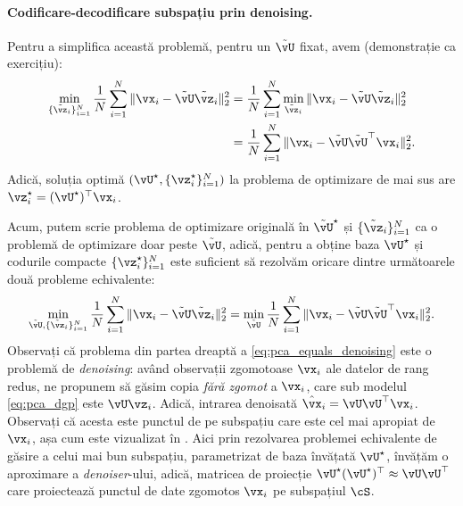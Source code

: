 \documentclass[../../book-main_ro.tex]{subfiles}
\begin{document}
\paragraph{Codificare-decodificare subspațiu prin denoising.}
Pentru a simplifica această problemă, pentru un \(\tilde{\vU}\) fixat, avem (demonstrație ca exercițiu):
\begin{align}
    \min_{\{\tilde{\vz}_{i}\}_{i = 1}^{N}}\frac{1}{N}\sum_{i = 1}^{N}\norm{\vx_{i} - \tilde{\vU}\tilde{\vz}_{i}}_{2}^{2} 
    &= \frac{1}{N}\sum_{i = 1}^{N}\min_{\tilde{\vz}_{i}}\norm{\vx_{i} - \tilde{\vU}\tilde{\vz}_{i}}_{2}^{2} \\
    &= \frac{1}{N}\sum_{i = 1}^{N}\norm{\vx_{i} - \tilde{\vU}\tilde{\vU}^{\top}\vx_{i}}_{2}^{2}. 
\end{align}
Adică, soluția optimă \((\vU^{\star}, \{\vz_{i}^{\star}\}_{i = 1}^{N})\)
la problema de optimizare de mai sus are $\vz_i^{\star} = (\vU^{\star})^\top\vx_i$.

Acum, putem scrie problema de optimizare originală în \(\tilde{\vU}^{\star}\)
și \(\{\tilde{\vz}_{i}\}_{i = 1}^{N}\) ca o problemă de optimizare doar peste
\(\tilde{\vU}\), adică, pentru a obține baza \(\vU^{\star}\) și codurile compacte
\(\{\vz_{i}^{\star}\}_{i = 1}^{N}\) este suficient să rezolvăm oricare dintre următoarele două probleme echivalente:
\begin{equation}\label{eq:pca_equals_denoising}
    \min_{\tilde{\vU}, \{\tilde{\vz}_{i}\}_{i = 1}^{N}}\frac{1}{N}\sum_{i = 1}^{N}\norm{\vx_{i} - \tilde{\vU}\tilde{\vz}_{i}}_{2}^{2} = \min_{\tilde{\vU}}\frac{1}{N}\sum_{i = 1}^{N}\norm{\vx_{i} - \tilde{\vU}\tilde{\vU}^{\top}\vx_{i}}_{2}^{2}.
\end{equation}
Observați că problema din partea dreaptă a \eqref{eq:pca_equals_denoising}
este o problemă de \textit{denoising}: având observații zgomotoase \(\vx_{i}\) ale
datelor de rang redus, ne propunem să găsim copia \textit{fără zgomot} a \(\vx_{i}\), care
sub modelul \eqref{eq:pca_dgp} este $\vU\vz_{i}$. Adică, intrarea denoisată
$\hat{\vx}_i = \vU\vU^\top \vx_i$. Observați că acesta este punctul de pe subspațiu
care este cel mai apropiat de $\vx_i$, așa cum este vizualizat în . Aici prin
rezolvarea problemei echivalente de găsire a celui mai bun subspațiu, parametrizat de
baza învățată \(\vU^{\star}\), învățăm o aproximare a
\textit{denoiser}-ului, adică, matricea de proiecție \(\vU^{\star}(\vU^{\star})^{\top} \approx \vU\vU^{\top}\) care proiectează punctul de date zgomotos $\vx_i$ pe subspațiul \(\cS\). %
\end{document}
